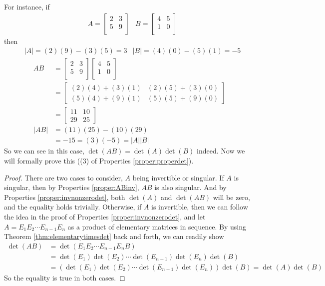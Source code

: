 For instance, if
\begin{align*}
&A = 
\begin{bmatrix}
2 & 3 \\
5 & 9 \\
\end{bmatrix}
&B = 
\begin{bmatrix}
4 & 5 \\
1 & 0 \\
\end{bmatrix}
\end{align*}
then
\begin{align*}
&|A| = (2)(9) - (3)(5) = 3 
&|B| = (4)(0) - (5)(1) = -5
\end{align*}
\begin{align*}
AB &= 
\begin{bmatrix}
2 & 3 \\
5 & 9 \\
\end{bmatrix}
\begin{bmatrix}
4 & 5 \\
1 & 0 \\
\end{bmatrix} \\
&= 
\begin{bmatrix}
(2)(4)+(3)(1) & (2)(5)+(3)(0) \\
(5)(4)+(9)(1) & (5)(5)+(9)(0)
\end{bmatrix} \\
&= 
\begin{bmatrix}
11 & 10 \\
29 & 25
\end{bmatrix} \\
|AB| &= (11)(25) - (10)(29) \\
&= -15 = (3)(-5) = |A||B|
\end{align*}
So we can see in this case, $\det(AB) = \det(A)\det(B)$ indeed. Now we will formally prove this ((3) of Properties \ref{proper:properdet}).
\begin{proof}
There are two cases to consider, $A$ being invertible or singular. If $A$ is singular, then by Properties \ref{proper:ABinv}, $AB$ is also singular. And by Properties \ref{proper:invnonzerodet}, both $\det(A)$ and $\det(AB)$ will be zero, and the equality holds trivially. Otherwise, if $A$ is invertible, then we can follow the idea in the proof of Properties \ref{proper:invnonzerodet}, and let $A = E_{1}E_{2} \cdots E_{n-1}E_n$ as a product of elementary matrices in sequence. By using Theorem \ref{thm:elementarytimesdet} back and forth, we can readily show
\begin{align*}
\det(AB) &= \det(E_{1}E_{2} \cdots E_{n-1}E_nB) \\
&= \det(E_1) \det(E_{2}) \cdots \det(E_{n-1})\det(E_n)\det(B) \\
&= (\det(E_1) \det(E_{2}) \cdots \det(E_{n-1})\det(E_n))\det(B) = \det(A)\det(B)
\end{align*}
So the equality is true in both cases.
\end{proof}
